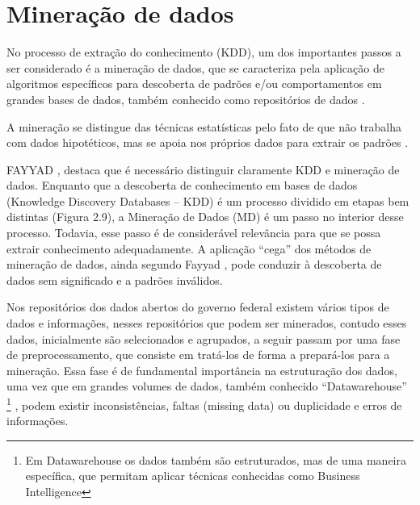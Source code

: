

\section{Mineração de dados}

No processo de extração do conhecimento (KDD), um dos importantes passos a ser considerado é a mineração de dados, que se caracteriza pela aplicação de algoritmos 
específicos para descoberta de padrões e/ou comportamentos em grandes bases de dados, também conhecido como repositórios de dados \cite{FayyadUeoutros}.

A mineração se distingue das técnicas estatísticas pelo fato de que  não trabalha com dados hipotéticos, mas se apoia nos próprios dados para extrair os padrões \cite{Castanheira2008}. 

FAYYAD \cite{FayyadUeoutros}, destaca que é necessário distinguir claramente KDD e mineração de dados. Enquanto que a descoberta de conhecimento em bases de dados (Knowledge Discovery Databases -- KDD) é um processo dividido em etapas bem distintas (Figura 2.9), a Mineração de Dados (MD) é um passo no interior desse processo. 
Todavia, esse passo é de considerável relevância para que se possa extrair conhecimento adequadamente. 
A aplicação “cega” dos métodos de mineração de dados, ainda segundo Fayyad \cite{FayyadUeoutros}, pode conduzir à descoberta de dados sem significado e a padrões inválidos. 

Nos repositórios dos dados abertos do governo federal \cite{DadosGoverno} existem vários tipos de dados e informações, nesses repositórios que podem ser minerados, contudo esses dados, inicialmente são selecionados e agrupados, a seguir passam por uma fase de preprocessamento, que consiste em tratá-los de forma a prepará-los para a mineração. Essa fase é de fundamental importância na estruturação dos dados, uma vez que em grandes volumes de dados, também conhecido ``Datawarehouse'' \footnote{Em Datawarehouse os dados também são estruturados, mas de uma maneira específica, que permitam aplicar técnicas conhecidas como Business Intelligence } \cite{RalphKimball2013}, podem existir inconsistências, faltas (missing data) ou 
duplicidade e erros de informações.

